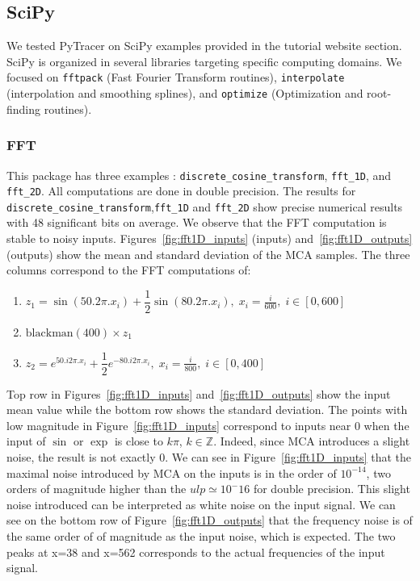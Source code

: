 \documentclass[11pt]{article}
\newcommand{\tristan}[1]{\color{orange}\textbf{From Tristan:} #1\color{black}\xspace}
\newcommand{\Yohan}[1]{\color{green!75!black}\textbf{Yohan:} #1\color{black}\xspace}
\newcommand{\pytracer}[0]{PyTracer\xspace}
\begin{document}
\subsection{SciPy}
\label{sec:scipy_tests}

We tested \pytracer on SciPy examples provided in the tutorial website section. 
SciPy is organized in several libraries targeting specific computing domains. We focused on \texttt{fftpack} (Fast Fourier Transform routines), \texttt{interpolate} (interpolation and smoothing splines), and \texttt{optimize} (Optimization and root-finding routines).

\subsubsection{FFT}

This package has three examples : \texttt{discrete\_cosine\_transform}, \texttt{fft\_1D}, and \texttt{fft\_2D}. All computations are done in double precision.
The results for \texttt{discrete\_cosine\_transform},\texttt{fft\_1D} and  \texttt{fft\_2D} show
precise numerical results with 48 significant bits on average. 
We observe that the FFT computation is stable to noisy inputs. Figures~\ref{fig:fft1D_inputs} (inputs) and~\ref{fig:fft1D_outputs} (outputs)
show the mean and standard deviation of the MCA samples. 
The three columns correspond to the FFT computations of: 
\begin{enumerate}
\item $z_1 = \sin(50 . 2\pi . x_i) + \dfrac{1}{2} \sin(80 . 2\pi . x_i),\; x_i = \frac{i}{600},\; i \in [0,600]$
\item $\mathrm{blackman}(400) \times z_1$
\item $ z_2= e^{50 . i 2\pi . x_i} + \dfrac{1}{2} e^{-80 . i2\pi .x_i },\; x_i = \frac{i}{800},\; i \in [0,400] $
\end{enumerate}

Top row in Figures~\ref{fig:fft1D_inputs} and~\ref{fig:fft1D_outputs} 
show the input mean value while the bottom row shows the standard deviation.
The points with low magnitude in Figure~\ref{fig:fft1D_inputs} correspond 
to inputs near 0 when the input of $\sin$ or 
$\exp$ is close to $k\pi$, $k \in \mathbb{Z}$.
Indeed, since MCA introduces a slight noise, the result is not exactly 0.
We can see in Figure~\ref{fig:fft1D_inputs} 
that the maximal noise introduced by MCA on the
inputs is in the order of $10^{-14}$, two orders of magnitude higher than the 
$ulp \simeq 10^-16$ for double precision. 
This slight noise introduced can be interpreted as white noise on the input signal. 
We can see on the bottom row of Figure~\ref{fig:fft1D_outputs} that the frequency noise is of 
the same order of of magnitude as the input noise, which is expected. 
The two peaks at x=38 and x=562 corresponds to the actual frequencies of the input signal.
\end{document}
